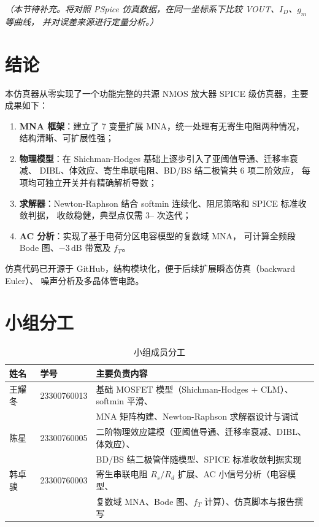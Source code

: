 \documentclass[12pt, a4paper]{article}
\begin{document}
\textit{（本节待补充。将对照 PSpice 仿真数据，在同一坐标系下比较 VOUT、$I_D$、$g_m$ 等曲线，
  并对误差来源进行定量分析。）}

\section{结论}

本仿真器从零实现了一个功能完整的共源 NMOS 放大器 SPICE 级仿真器，主要成果如下：

\begin{enumerate}
  \item \textbf{MNA 框架}：建立了 7 变量扩展 MNA，统一处理有无寄生电阻两种情况，
        结构清晰、可扩展性强；
  \item \textbf{物理模型}：在 Shichman-Hodges 基础上逐步引入了亚阈值导通、迁移率衰减、
        DIBL、体效应、寄生串联电阻、BD/BS 结二极管共 6 项二阶效应，
        每项均可独立开关并有精确解析导数；
  \item \textbf{求解器}：Newton-Raphson 结合 softmin 连续化、阻尼策略和 SPICE 标准收敛判据，
        收敛稳健，典型点仅需 3\;-- 次迭代；
  \item \textbf{AC 分析}：实现了基于电荷分区电容模型的复数域 MNA，
        可计算全频段 Bode 图、$-3\,\mathrm{dB}$ 带宽及 $f_T$。
\end{enumerate}

仿真代码已开源于 GitHub，结构模块化，便于后续扩展瞬态仿真（backward Euler）、
噪声分析及多晶体管电路。

\section{小组分工}

\begin{table}[H]
\centering
\caption{小组成员分工}
\begin{tabular}{lll}
\toprule
姓名 & 学号 & 主要负责内容 \\
\midrule
王耀冬 & 23300760013 &
  基础 MOSFET 模型（Shichman-Hodges + CLM）、softmin 平滑、\\
  & & MNA 矩阵构建、Newton-Raphson 求解器设计与调试 \\[0.4em]
陈星   & 23300760005 &
  二阶物理效应建模（亚阈值导通、迁移率衰减、DIBL、体效应）、\\
  & & BD/BS 结二极管伴随模型、SPICE 标准收敛判据实现 \\[0.4em]
韩卓骏 & 23300760003 &
  寄生串联电阻 $R_s/R_d$ 扩展、AC 小信号分析（电容模型、\\
  & & 复数域 MNA、Bode 图、$f_T$ 计算）、仿真脚本与报告撰写 \\
\bottomrule
\end{tabular}
\end{table}
\end{document}
